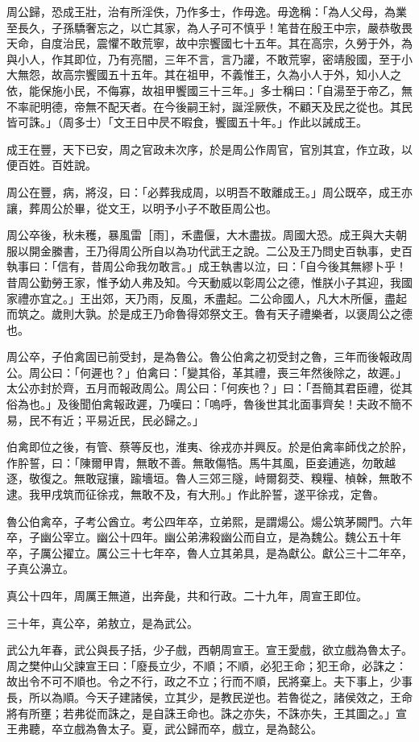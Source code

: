 \begin{pinyinscope}
周公歸，恐成王壯，治有所淫佚，乃作多士，作毋逸。毋逸稱：「為人父母，為業至長久，子孫驕奢忘之，以亡其家，為人子可不慎乎！笔昔在殷王中宗，嚴恭敬畏天命，自度治民，震懼不敢荒寧，故中宗饗國七十五年。其在高宗，久勞于外，為與小人，作其即位，乃有亮闇，三年不言，言乃讙，不敢荒寧，密靖殷國，至于小大無怨，故高宗饗國五十五年。其在祖甲，不義惟王，久為小人于外，知小人之依，能保施小民，不侮寡，故祖甲饗國三十三年。」多士稱曰：「自湯至于帝乙，無不率祀明德，帝無不配天者。在今後嗣王紂，誕淫厥佚，不顧天及民之從也。其民皆可誅。」（周多士）「文王日中昃不暇食，饗國五十年。」作此以誡成王。

成王在豐，天下已安，周之官政未次序，於是周公作周官，官別其宜，作立政，以便百姓。百姓說。

周公在豐，病，將沒，曰：「必葬我成周，以明吾不敢離成王。」周公既卒，成王亦讓，葬周公於畢，從文王，以明予小子不敢臣周公也。

周公卒後，秋未穫，暴風雷［雨］，禾盡偃，大木盡拔。周國大恐。成王與大夫朝服以開金縢書，王乃得周公所自以為功代武王之說。二公及王乃問史百執事，史百執事曰：「信有，昔周公命我勿敢言。」成王執書以泣，曰：「自今後其無繆卜乎！昔周公勤勞王家，惟予幼人弗及知。今天動威以彰周公之德，惟朕小子其迎，我國家禮亦宜之。」王出郊，天乃雨，反風，禾盡起。二公命國人，凡大木所偃，盡起而筑之。歲則大孰。於是成王乃命魯得郊祭文王。魯有天子禮樂者，以褒周公之德也。

周公卒，子伯禽固已前受封，是為魯公。魯公伯禽之初受封之魯，三年而後報政周公。周公曰：「何遲也？」伯禽曰：「變其俗，革其禮，喪三年然後除之，故遲。」太公亦封於齊，五月而報政周公。周公曰：「何疾也？」曰：「吾簡其君臣禮，從其俗為也。」及後聞伯禽報政遲，乃嘆曰：「嗚呼，魯後世其北面事齊矣！夫政不簡不易，民不有近；平易近民，民必歸之。」

伯禽即位之後，有管、蔡等反也，淮夷、徐戎亦并興反。於是伯禽率師伐之於肸，作肸誓，曰：「陳爾甲胄，無敢不善。無敢傷牿。馬牛其風，臣妾逋逃，勿敢越逐，敬復之。無敢寇攘，踰墻垣。魯人三郊三隧，峙爾芻茭、糗糧、楨榦，無敢不逮。我甲戌筑而征徐戎，無敢不及，有大刑。」作此肸誓，遂平徐戎，定魯。

魯公伯禽卒，子考公酋立。考公四年卒，立弟熙，是謂煬公。煬公筑茅闕門。六年卒，子幽公宰立。幽公十四年。幽公弟沸殺幽公而自立，是為魏公。魏公五十年卒，子厲公擢立。厲公三十七年卒，魯人立其弟具，是為獻公。獻公三十二年卒，子真公濞立。

真公十四年，周厲王無道，出奔彘，共和行政。二十九年，周宣王即位。

三十年，真公卒，弟敖立，是為武公。

武公九年春，武公與長子括，少子戲，西朝周宣王。宣王愛戲，欲立戲為魯太子。周之樊仲山父諫宣王曰：「廢長立少，不順；不順，必犯王命；犯王命，必誅之：故出令不可不順也。令之不行，政之不立；行而不順，民將棄上。夫下事上，少事長，所以為順。今天子建諸侯，立其少，是教民逆也。若魯從之，諸侯效之，王命將有所壅；若弗從而誅之，是自誅王命也。誅之亦失，不誅亦失，王其圖之。」宣王弗聽，卒立戲為魯太子。夏，武公歸而卒，戲立，是為懿公。


\end{pinyinscope}
